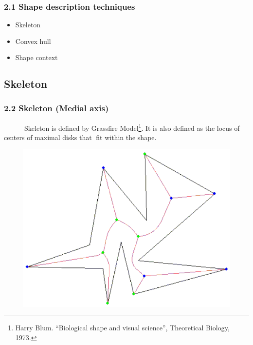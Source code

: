 \documentclass[notheorems,serif,table,compress]{beamer}  %
\begin{document}
\begin{frame}
\frametitle{2.1 Shape description techniques}
    \begin{itemize}
        \item Skeleton
        \item Convex hull
        \item Shape context
    \end{itemize}
\end{frame}

\subsection{Skeleton}

\begin{frame}
\frametitle{2.2 Skeleton (Medial axis)}
~~~~~~Skeleton is defined by {\color{blue}Grassfire Model}\footnote{Harry Blum. ``Biological shape and visual science'', Theoretical Biology, 1973.}. It is also defined as the locus of centers of maximal disks that 􏰁fit within the shape.    
            \begin{figure}
              \centering
              \begin{minipage}[t]{0.4\linewidth}
              \includegraphics[width=1\linewidth]{gu} 
              \end{minipage}
              \begin{minipage}[t]{0.28\linewidth}

\end{minipage}
\end{figure}
\end{frame}
\end{document}
